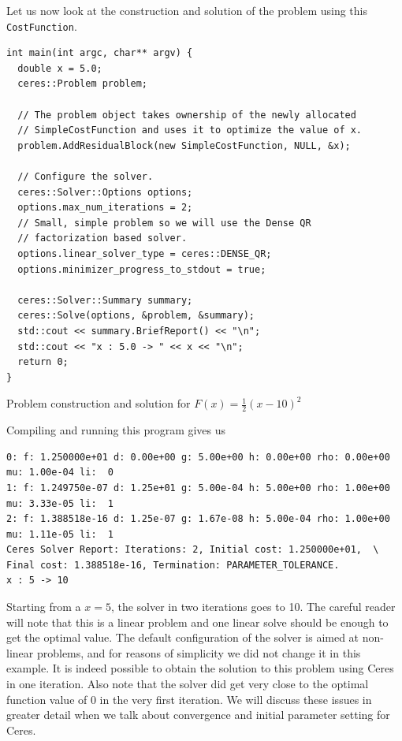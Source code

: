 Let us now look at the construction and solution of the problem using this \texttt{CostFunction}.
\begin{listing}[H]
\begin{verbatim}
int main(int argc, char** argv) {
  double x = 5.0;
  ceres::Problem problem;

  // The problem object takes ownership of the newly allocated
  // SimpleCostFunction and uses it to optimize the value of x.
  problem.AddResidualBlock(new SimpleCostFunction, NULL, &x);

  // Configure the solver.
  ceres::Solver::Options options;
  options.max_num_iterations = 2;
  // Small, simple problem so we will use the Dense QR
  // factorization based solver.
  options.linear_solver_type = ceres::DENSE_QR;
  options.minimizer_progress_to_stdout = true;

  ceres::Solver::Summary summary;
  ceres::Solve(options, &problem, &summary);
  std::cout << summary.BriefReport() << "\n";
  std::cout << "x : 5.0 -> " << x << "\n";
  return 0;
}
\end{verbatim}
\caption{Problem construction and solution for $F(x) = \frac{1}{2}(x-10)^2$}
\end{listing}

Compiling and running this program gives us
\begin{verbatim}
0: f: 1.250000e+01 d: 0.00e+00 g: 5.00e+00 h: 0.00e+00 rho: 0.00e+00 mu: 1.00e-04 li:  0
1: f: 1.249750e-07 d: 1.25e+01 g: 5.00e-04 h: 5.00e+00 rho: 1.00e+00 mu: 3.33e-05 li:  1
2: f: 1.388518e-16 d: 1.25e-07 g: 1.67e-08 h: 5.00e-04 rho: 1.00e+00 mu: 1.11e-05 li:  1
Ceres Solver Report: Iterations: 2, Initial cost: 1.250000e+01,  \
Final cost: 1.388518e-16, Termination: PARAMETER_TOLERANCE.
x : 5 -> 10
\end{verbatim}

Starting from a $x=5$, the solver in two iterations goes to 10. The careful reader will note that this is a linear problem and one linear solve should be enough to get the optimal value.  The default configuration of the solver is aimed at non-linear problems, and for reasons of simplicity we did not change it in this example. It is indeed possible to obtain the solution to this problem using Ceres in one iteration. Also note that the solver did get very close to the optimal function value of 0 in the very first iteration. We will discuss these issues in greater detail when we talk about convergence and initial parameter setting for Ceres.

